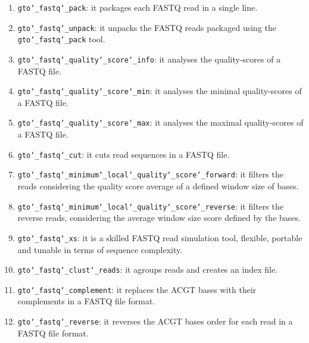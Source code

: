 \begin{enumerate}
\item \texttt{gto\char`_fastq\char`_pack}: it packages each FASTQ read in a single line.

\item \texttt{gto\char`_fastq\char`_unpack}: it unpacks the FASTQ reads packaged using the \texttt{gto\char`_fastq\char`_pack} tool.

\item \texttt{gto\char`_fastq\char`_quality\char`_score\char`_info}: it analyses the quality-scores of a FASTQ file.

\item \texttt{gto\char`_fastq\char`_quality\char`_score\char`_min}: it analyses the minimal quality-scores of a FASTQ file.

\item \texttt{gto\char`_fastq\char`_quality\char`_score\char`_max}: it analyses the maximal quality-scores of a FASTQ file.

\item \texttt{gto\char`_fastq\char`_cut}: it cuts read sequences in a FASTQ file. 

\item \texttt{gto\char`_fastq\char`_minimum\char`_local\char`_quality\char`_score\char`_forward}: it filters the reads considering the quality score average of a defined window size of bases.

\item \texttt{gto\char`_fastq\char`_minimum\char`_local\char`_quality\char`_score\char`_reverse}: it filters the reverse reads, considering the average window size score defined by the bases.

\item \texttt{gto\char`_fastq\char`_xs}: it is a skilled FASTQ read simulation tool, flexible, portable and tunable in terms of sequence complexity.

\item \texttt{gto\char`_fastq\char`_clust\char`_reads}: it agroups reads and creates an index file.

\item \texttt{gto\char`_fastq\char`_complement}: it replaces the ACGT bases with their complements in a FASTQ file format.

\item \texttt{gto\char`_fastq\char`_reverse}: it reverses the ACGT bases order for each read in a FASTQ file format.

\end{enumerate}

